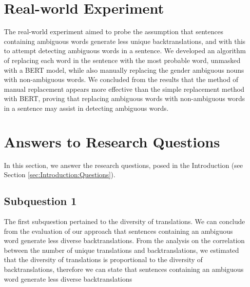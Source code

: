 
 
\section{Real-world Experiment}
\label{sec:Discussion:Real}

The real-world experiment aimed to probe the assumption that sentences containing ambiguous words generate less unique backtranslations, and with this to attempt detecting ambiguous words in a sentence. We developed an algorithm of replacing each word in the sentence with the most probable word, unmasked with a BERT model, while also manually replacing the gender ambiguous nouns with non-ambiguous words. We concluded from the results that the method of manual replacement appears more effective than the simple replacement method with BERT, proving that replacing ambiguous words with non-ambiguous words in a sentence may assist in detecting ambiguous words.


\section{Answers to Research Questions}
\label{sec:Discussion:Answers}

In this section, we answer the research questions, posed in the Introduction (see Section \ref{sec:Introduction:Questions}).

\subsection{Subquestion 1} %
\label{sec:Discussion:Answers:1}

The first subquestion pertained to the diversity of translations. We can conclude from the evaluation of our approach that sentences containing an ambiguous word generate less diverse backtranslations. From the analysis on the correlation between the number of unique translations and backtranslations, we estimated that the diversity of translations is proportional to the diversity of backtranslations, therefore we can state that sentences containing an ambiguous word generate less diverse backtranslations

